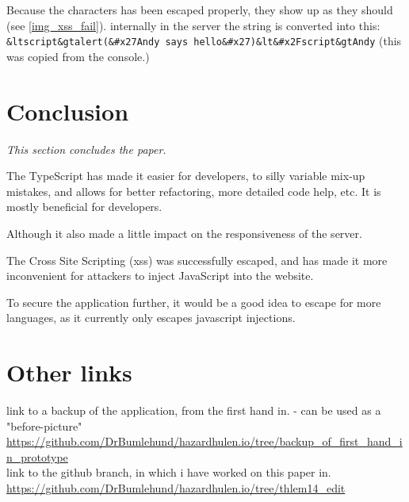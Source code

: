 \documentclass[a4paper]{article}
\begin{document}
Because the characters has been escaped properly, they show up as they should (see \autoref{img_xss_fail}). internally in the server the string is converted into this: \\\texttt{\&ltscript\&gtalert(\&\#x27Andy says hello\&\#x27)\&lt\&\#x2Fscript\&gtAndy} (this was copied from the console.)




\section{Conclusion}
\textit{This section concludes the paper.}

The TypeScript has made it easier for developers, to silly variable mix-up mistakes, and allows for better refactoring, more detailed code help, etc. It is mostly beneficial for developers.

Although it also made a little impact on the responsiveness of the server.

The Cross Site Scripting (xss) was successfully escaped, and has made it more inconvenient for attackers to inject JavaScript into the website.

To secure the application further, it would be a good idea to escape for more languages, as it currently only escapes javascript injections.

\label{page_b4_appendices}




\clearpage
{}
\setcounter{page}{0}
\rfoot{ }



\listoffigures
\listoflistings

\section*{Other links}
link to a backup of the application, from the first hand in. - can be used as a "before-picture"\\
\url{https://github.com/DrBumlehund/hazardhulen.io/tree/backup_of_first_hand_in_prototype}\\

link to the github branch, in which i have worked on this paper in.\\
\url{https://github.com/DrBumlehund/hazardhulen.io/tree/thlem14_edit}
\end{document}
